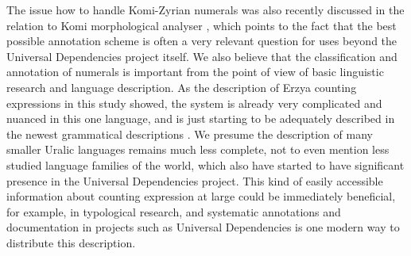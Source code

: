 \documentclass[free]{flammie}
\begin{document}
The issue how to handle Komi-Zyrian numerals was also recently discussed in the
relation to Komi morphological analyser \cite[67]{rueter2021komifst}, which
points to the fact that the best possible annotation scheme is often a very
relevant question for uses beyond the Universal Dependencies project itself. We
also believe that the classification and annotation of numerals is important
from the point of view of basic linguistic research and language description. As
the description of Erzya counting expressions in this study showed, the system
is already very complicated and nuanced in this one language, and is just
starting to be adequately described in the newest grammatical descriptions
\cite{suihkonen2013typology}. We presume the description of many smaller Uralic
languages remains much less complete, not to even mention less studied language
families of the world, which also have started to have significant presence in
the Universal Dependencies project. This kind of easily accessible information
about counting expression at large could be immediately beneficial, for example,
in typological research, and systematic annotations and documentation in
projects such as Universal Dependencies is one modern way to distribute this
description.





\end{document}
